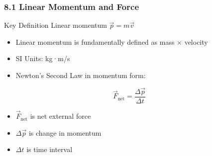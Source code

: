 \documentclass[aspectratio=169]{beamer}
\begin{document}
\begin{frame}
\frametitle{8.1 Linear Momentum and Force}
\begin{block}{Key Definition}
Linear momentum $\vec{p} = m\vec{v}$
\end{block}

\begin{itemize}
\item Linear momentum is fundamentally defined as mass × velocity
\item SI Units: kg·m/s
\item Newton's Second Law in momentum form:
\end{itemize}

\begin{equation*}
\vec{F}_{\text{net}} = \frac{\Delta \vec{p}}{\Delta t}
\end{equation*}

\begin{itemize}
\item $\vec{F}_{\text{net}}$ is net external force
\item $\Delta \vec{p}$ is change in momentum
\item $\Delta t$ is time interval
\end{itemize}
\end{frame}
\end{document}
